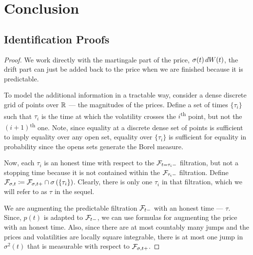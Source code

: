 \documentclass[11pt, letterpaper, twoside, final]{article}
\begin{document}
\section{Conclusion}

\clearpage

{}
\printbibliography
\clearpage

\begin{appendices}


\section{Identification Proofs}

\priceDGPGivenVol*

\begin{proof}

    We work directly with the martingale part of the price, $\sigma(t) \mathop{}\!d W(t)$, the drift part can just be
    added back to the price when we are finished because it is predictable.
    
    To model the additional information in a tractable way, consider a dense discrete grid of points over $\mathbb{R}$ ---
    the magnitudes of the prices.
    Define a set of times $\lbrace \tau_i\rbrace $ such that $\tau_i$ is the time at which the volatility crosses
    the $i$\textsuperscript{th} point, but not the $(i+1)$\textsuperscript{th} one. 
    Note, since equality at a discrete dense set of points is sufficient to imply equality over any open set,
    equality over $\lbrace \tau_i \rbrace$ is sufficient for equality in probability since the opens sets generate
    the Borel measure.
    
    Now, each $\tau_i$ is an honest time with respect to the $\mathcal{F}_{t=\tau_i-}$ filtration, but not a stopping time
    because it is not contained within the $\mathcal{F}_{\tau_i-}$ filtration.
    Define $\mathcal{F}_{\sigma,t} \coloneqq \mathcal{F}_{\sigma, t+} \cap \sigma\left(\lbrace \tau_i \rbrace\right)$. 
    Clearly, there is only one $\tau_i$ in that filtration, which we will refer to as $\tau$ in the sequel.
    
    We are augmenting the predictable filtration $\mathcal{F}_{t-}$ with an honest time --- $\tau$.
    Since, $p(t)$ is adapted to $\mathcal{F}_{t-}$, we can use formulas for augmenting the price with an honest time. 
    Also, since there are at most countably many jumps and the prices and volatilities are locally square
    integrable, there is at most one jump in $\sigma^2(t)$ that is measurable with respect to $\mathcal{F}_{\sigma, t+}$.
    

\end{proof}
\end{appendices}
\end{document}

